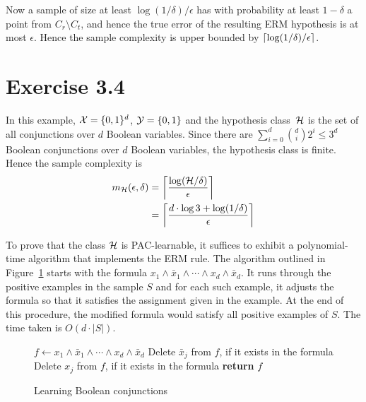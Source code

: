 Now a sample of size at least $\log(1 / \delta) / \epsilon$ has with probability at least $1 - \delta$ a point from $C_r \setminus C_t$, and hence the true error of the resulting ERM hypothesis is at most $\epsilon$. Hence the sample complexity is upper bounded by $\left \lceil \log(1 / \delta) / \epsilon \right \rceil$.

\section*{Exercise 3.4}

In this example, $\mathcal{X} = \{0, 1\}^d$, $\mathcal{Y} = \{0, 1\}$ and the hypothesis class~$\mathcal{H}$ is the set of all conjunctions over $d$ Boolean variables. Since there are $\sum_{i = 0}^{d} {d \choose i} 2^i \leq 3^{d}$ Boolean conjunctions over $d$ Boolean variables, the hypothesis class is finite. Hence the sample complexity is 
\begin{align*}
	m_{\mathcal{H}}(\epsilon, \delta) & = \left \lceil \frac{\log (\mathcal{H} / \delta)}{\epsilon} \right \rceil \\
	& = \left \lceil \frac{d \cdot \log 3 + \log (1 / \delta)}{\epsilon} \right \rceil
\end{align*}

To prove that the class $\mathcal{H}$ is PAC-learnable, it suffices to exhibit a polynomial-time algorithm that implements the ERM rule. The algorithm outlined in Figure~\ref{fig:pac_boolean_conjunctions} starts with the formula $x_1 \land \bar{x}_1 \land \cdots \land x_d \land \bar{x}_d$. It runs through the positive examples in the sample $S$ and for each such example, it adjusts the formula so that it satisfies the assignment given in the example. At the end of this procedure, the modified formula would satisfy all positive examples of $S$. The time taken is $O(d \cdot |S|)$. 
\begin{figure}
    \begin{algorithmic}[0] %
            \State $f \gets x_1 \land \bar{x}_1 \land \cdots 
            \land x_d \land \bar{x}_d$
            			\State Delete $\bar{x}_j$ from $f$, if it exists in the formula
            		\Else
            			\State Delete $x_j$ from $f$, if it exists in the formula
            		\EndIf
             	\EndFor
            \EndFor
            \State \textbf{return} $f$
        \EndProcedure
    \end{algorithmic}
\caption{Learning Boolean conjunctions}
\label{fig:pac_boolean_conjunctions}
\end{figure}

